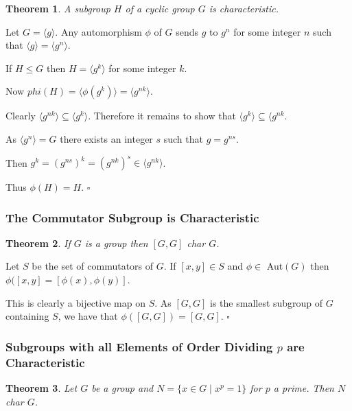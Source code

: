 \documentclass[10pt]{article}
\newtheorem{theorem}{Theorem}[section]
\newenvironment{proof}[1][Proof]{\begin{trivlist}
\item[\hskip \labelsep {\itshape #1}]}{\end{trivlist}}
\begin{document}
\begin{theorem}
A subgroup $H$ of a cyclic group $G$ is characteristic.
\end{theorem}

\begin{proof}
Let $G = \langle g \rangle$. Any automorphism $\phi$ of $G$ sends $g$ to $g^n$ for some integer $n$ such that $\langle g \rangle = \langle g^n \rangle$.

If $H \leq G$ then $H = \langle g^k \rangle$ for some integer $k$.

Now $phi(H) = \langle \phi(g^k) \rangle = \langle g^{nk} \rangle$.

Clearly $\langle g^{nk} \rangle \subseteq \langle g^k \rangle$. Therefore it remains to show that $\langle g^k \rangle \subseteq \langle g^{nk}$.

As $\langle g^n \rangle = G$ there exists an integer $s$ such that $g = g^{ns}$.

Then $g^k = (g^{ns})^k = (g^{nk})^s \in \langle g^{nk} \rangle$.

Thus $\phi(H) = H$. $\square$
\end{proof}

\subsubsection{The Commutator Subgroup is Characteristic}

\begin{theorem}
If $G$ is a group then $[G, G]$ char $G$.
\end{theorem}

\begin{proof}
Let $S$ be the set of commutators of $G$. If $[x, y] \in S$ and $\phi \in$ Aut$(G)$ then $\phi([x, y] = [\phi(x), \phi(y)]$.

This is clearly a bijective map on $S$. As $[G, G]$ is the smallest subgroup of $G$ containing $S$, we have that $\phi([G, G]) = [G, G]$. $\square$
\end{proof}

\subsubsection{Subgroups with all Elements of Order Dividing $p$ are Characteristic}

\begin{theorem}
Let $G$ be a group and $N = \{x \in G \;|\; x^p = 1\}$ for $p$ a prime. Then $N$ char $G$.
\end{theorem}
\end{document}
